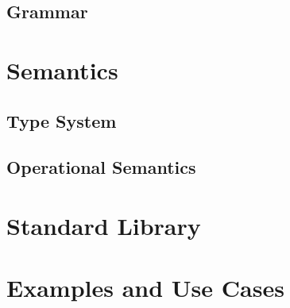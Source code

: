 \documentclass[11pt]{article}
\begin{document}
\subsection{Grammar}

\section{Semantics}
\subsection{Type System}

\subsection{Operational Semantics}

\section{Standard Library}

\section{Examples and Use Cases}




\appendix


\end{document}
